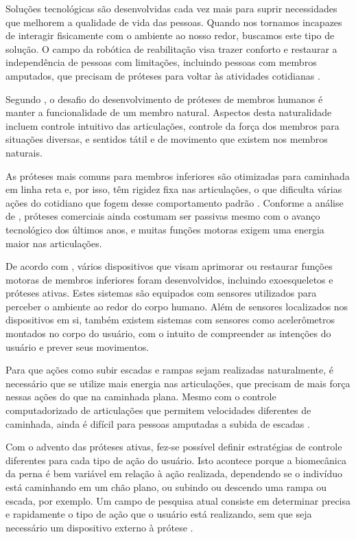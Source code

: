 Soluções tecnológicas são desenvolvidas cada vez mais para suprir necessidades que melhorem a qualidade de vida das pessoas. Quando nos tornamos incapazes de interagir fisicamente com o ambiente ao nosso redor, buscamos este tipo de solução. O campo da robótica de reabilitação visa trazer conforto e restaurar a independência de pessoas com limitações, incluindo pessoas com membros amputados, que precisam de próteses para voltar às atividades cotidianas \cite{siciliano:2008}.

Segundo , o desafio do desenvolvimento de próteses de membros humanos é manter a funcionalidade de um membro natural. Aspectos desta naturalidade incluem controle intuitivo das articulações, controle da força dos membros para situações diversas, e sentidos tátil e de movimento que existem nos membros naturais.

As próteses mais comuns para membros inferiores são otimizadas para caminhada em linha reta e, por isso, têm rigidez fixa nas articulações, o que dificulta várias ações do cotidiano que fogem desse comportamento padrão \cite{pew:2017}. Conforme a análise de , próteses comerciais ainda costumam ser passivas mesmo com o avanço tecnológico dos últimos anos, e muitas funções motoras exigem uma energia maior nas articulações.

De acordo com , vários dispositivos que visam aprimorar ou restaurar funções motoras de membros inferiores foram desenvolvidos, incluindo exoesqueletos e próteses ativas. Estes sistemas são equipados com sensores utilizados para perceber o ambiente ao redor do corpo humano. Além de sensores localizados nos dispositivos em si, também existem sistemas com sensores como acelerômetros montados no corpo do usuário, com o intuito de compreender as intenções do usuário e prever seus movimentos.

Para que ações como subir escadas e rampas sejam realizadas naturalmente, é necessário que se utilize mais energia nas articulações, que precisam de mais força nessas ações do que na caminhada plana. Mesmo com o controle computadorizado de articulações que permitem velocidades diferentes de caminhada, ainda é difícil para pessoas amputadas a subida de escadas \cite{dedic:2011}.

Com o advento das próteses ativas, fez-se possível definir estratégias de controle diferentes para cada tipo de ação do usuário. Isto acontece porque a biomecânica da perna é bem variável em relação à ação realizada, dependendo se o indivíduo está caminhando em um chão plano, ou subindo ou descendo uma rampa ou escada, por exemplo. Um campo de pesquisa atual consiste em determinar precisa e rapidamente o tipo de ação que o usuário está realizando, sem que seja necessário um dispositivo externo à prótese \cite{stolyarov:2017}.

